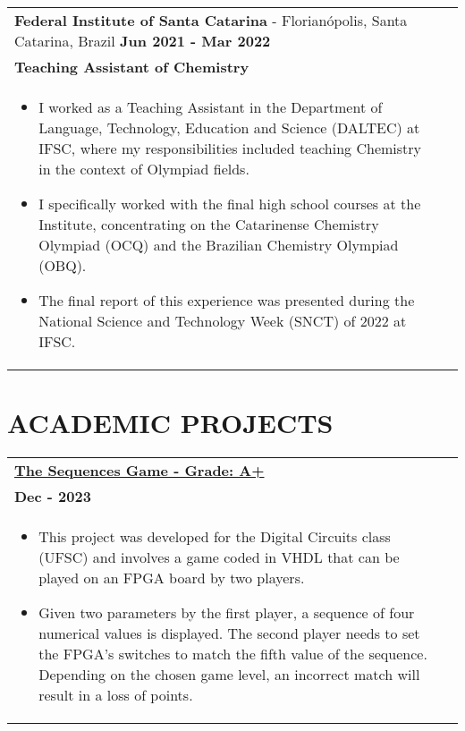 \documentclass[a4paper,8pt]{article}
\begin{document}
\begin{tabularx}{\linewidth}{ @{}l r@{} }
\textbf{Federal Institute of Santa Catarina} - Florianópolis, Santa Catarina, Brazil \hfill \textbf{Jun 2021 - Mar 2022} \\[4pt]
\textbf{Teaching Assistant of Chemistry} \\[4pt]
\begin{minipage}[t]{\linewidth}
    \begin{itemize}[nosep,after=\strut, leftmargin=1em, itemsep=2pt]
        \item I worked as a Teaching Assistant in the Department of Language, Technology, Education and Science (DALTEC) at IFSC, where my responsibilities included teaching Chemistry in the context of Olympiad fields.
        \item I specifically worked with the final high school courses at the Institute, concentrating on the Catarinense Chemistry Olympiad (OCQ) and the Brazilian Chemistry Olympiad (OBQ).
        \item The final report of this experience was presented during the National Science and Technology Week (SNCT) of 2022 at IFSC.
    \end{itemize}
\end{minipage}
\end{tabularx}

\section{\textbf{ACADEMIC PROJECTS}}
\begin{tabularx}{\linewidth}{ @{}l r@{} }
\textbf{\href{https://github.com/leonardosm14/Playlist-Generator}{The Sequences Game - Grade: A+}} \\[4pt]
\textbf{Dec - 2023} \\[4pt]
\begin{minipage}[t]{\linewidth}
    \begin{itemize}[nosep,after=\strut, leftmargin=1em, itemsep=2pt]
        \item This project was developed for the Digital Circuits class (UFSC) and involves a game coded in VHDL that can be played on an FPGA board by two players.
        \item Given two parameters by the first player, a sequence of four numerical values is displayed. The second player needs to set the FPGA's switches to match the fifth value of the sequence. Depending on the chosen game level, an incorrect match will result in a loss of points.
    \end{itemize}
\end{minipage}
\end{tabularx}
\end{document}
